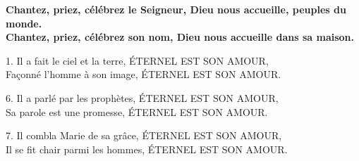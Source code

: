 \textbf{
Chantez, priez, célébrez le Seigneur,
Dieu nous accueille, peuples du monde.\\
Chantez, priez, célébrez son nom,
Dieu nous accueille dans sa maison.
}

1.
Il a fait le ciel et la terre,
ÉTERNEL EST SON AMOUR,\\
Façonné l’homme à son image,
ÉTERNEL EST SON AMOUR.

%
%
%

6.
Il a parlé par les prophètes,
ÉTERNEL EST SON AMOUR,\\
Sa parole est une promesse,
ÉTERNEL EST SON AMOUR.

7.
Il combla Marie de sa grâce,
ÉTERNEL EST SON AMOUR, \\
Il se fit chair parmi les hommes,
ÉTERNEL EST SON AMOUR.


